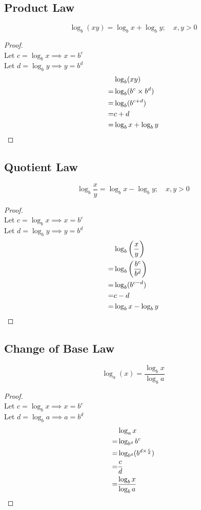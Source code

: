 		\subsection{Product Law}
			\[\log_b(xy) = \log_b x + \log_b y; \quad x, y > 0\]
			\begin{proof}~
				\\
				Let $c = \log_b x \implies x = b^c$
				\\
				Let $d = \log_b y \implies y = b^d$
				\begin{align*}
					 &\log_b (xy) \\
					=&\log_b (b^c \times b^d) \\
					=&\log_b (b^{c+d}) \\
					=&c+d \\
					=&\log_b x + \log_b y \qedhere
				\end{align*}
			\end{proof}
		\newpage
		\subsection{Quotient Law}
			\[\log_b \frac{x}{y} = \log_b x - \log_b y; \quad x, y > 0\]
			\begin{proof}~
				\\
				Let $c = \log_b x \implies x = b^c$
				\\
				Let $d = \log_b y \implies y = b^d$
				\begin{align*}
					 &\log_b \left(\frac{x}{y}\right) \\
					=&\log_b \left(\frac{b^c}{b^d}\right) \\
					=&\log_b (b^{c-d}) \\
					=&c-d \\
					=&\log_b x - \log_b y \qedhere
				\end{align*}
			\end{proof}
		\subsection{Change of Base Law}
			\[\log_a(x) = \frac{\log_b x}{\log_b a}\]
			\begin{proof}~
				\\
				Let $c = \log_b x \implies x = b^c$
				\\
				Let $d = \log_b a \implies a = b^d$
				\begin{align*}
					 &\log_a x \\
					=&\log_{b^d} b^c \\
					=&\log_{b^d} (b^{d \times \frac{c}{d}}) \\
					=&\frac{c}{d} \\
					=&\frac{\log_b x}{\log_b a} \qedhere
				\end{align*}
			\end{proof}

